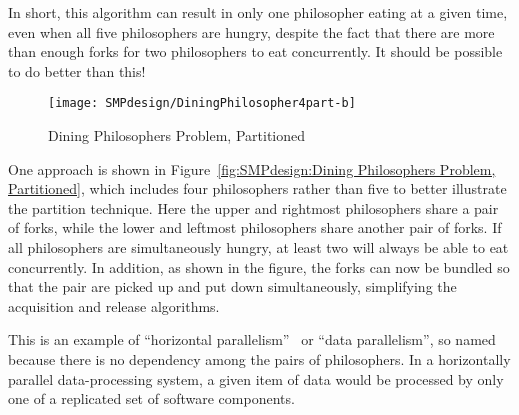 In short, this algorithm can result in only one philosopher eating at
a given time, even when all five philosophers are hungry,
despite the fact that there are more than enough forks for two
philosophers to eat concurrently.
It should be possible to do better than this!

\begin{figure}[tb]
\centering
\texttt{[image: SMPdesign/DiningPhilosopher4part-b]}
\caption{Dining Philosophers Problem, Partitioned}
\end{figure}

One approach is shown in
Figure~\ref{fig:SMPdesign:Dining Philosophers Problem, Partitioned},
which includes four philosophers rather than five to better illustrate the
partition technique.
Here the upper and rightmost philosophers share a pair of forks,
while the lower and leftmost philosophers share another pair of forks.
If all philosophers are simultaneously hungry, at least two will
always be able to eat concurrently.
In addition, as shown in the figure, the forks can now be bundled
so that the pair are picked up and put down simultaneously, simplifying
the acquisition and release algorithms.

\QuickQuizEnd

This is an example of ``horizontal parallelism''~\cite{Inman85}
or ``data parallelism'',
so named because there is no dependency among the pairs of philosophers.
In a horizontally parallel data-processing system, a given item of data
would be processed by only one of a replicated set of software
components.

